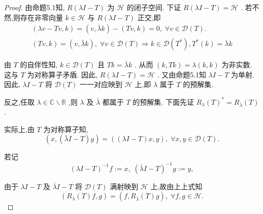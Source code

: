 \documentclass[lang=cn,newtx,10pt,scheme=chinese,thmcnt=chapter]{elegantbook}
\begin{document}
\begin{proof}
    由命题5.1知, \(R\left( {{\lambda I} - T}\right)\) 为 \(\mathcal{H}\) 的闭子空间. 下证 \(R\left( {{\lambda I} - T}\right)  = \mathcal{H}\) . 若不然,则存在非零向量 \(k \in  \mathcal{H}\) 与 \(R\left( {{\lambda I} - T}\right)\) 正交,即
\begin{equation*}
\begin{aligned}
    \left( {{\lambda v} - {Tv},k}\right)  = \left( {v,\bar{\lambda }k}\right)  - \left( {{Tv},k}\right)  = 0,\;\forall v \in  \mathcal{D}(T) .\\
\left( {{Tv},k}\right)  =     \left( {v,\bar{\lambda }k}\right)  ,\;\forall v \in  \mathcal{D}(T) \Rightarrow k\in\mathcal{D}(T^*),T^*(k)=\bar{\lambda}k
\end{aligned}
\end{equation*}

由 \(T\) 的自伴性知, \(k \in  \mathcal{D}(T)\) 且 \({Tk} = \bar{\lambda }k\) . 从而 \(\left( {k,{Tk}}\right)  = \lambda \left( {k,k}\right)\) 为非实数. 这与 \(T\) 为对称算子矛盾. 因此, \(R\left( {{\lambda I} - T}\right)  = \mathcal{H}\) . 又由命题5.1知 \({\lambda I} - T\) 为单射. 因此, \({\lambda I} - T\) 将 \(\mathcal{D}(T)\) 一一对应映到 \(\mathcal{H}\) 上,即 \(\lambda\) 属于 \(T\) 的预解集.

反之,任取 \(\lambda  \in  \mathbb{C} \smallsetminus  \mathbb{R}\) ,则 \(\lambda\) 及 \(\bar{\lambda }\) 都属于 \(T\) 的预解集. 下面先证 \({R}_{\lambda }{\left( T\right) }^{ * } = {R}_{\bar{\lambda }}\left( T\right)\) .

实际上,由 \(T\) 为对称算子知,
\begin{equation*}
\left( {x,\left( {\bar{\lambda }I - T}\right) y}\right)  = \left( {\left( {{\lambda I} - T}\right) x,y}\right) ,\;\forall x,y \in  \mathcal{D}(T) . \label{5.5}
\end{equation*}

若记
\begin{equation*}
{\left( \lambda I - T\right) }^{-1}f \mathrel{\text{ := }} x,\;{\left( \bar{\lambda }I - T\right) }^{-1}g \mathrel{\text{ := }} y, \label{5.6}
\end{equation*}

由于 \({\lambda I} - T\) 及 \(\bar{\lambda }I - T\) 将 \(\mathcal{D}(T)\) 满射映到 \(\mathcal{H}\) 上,故由上上式知
\begin{equation*}
\left( {{R}_{\lambda }\left( T\right) f,g}\right)  = \left( {f,{R}_{\bar{\lambda }}\left( T\right) g}\right) ,\;\forall f,g \in  \mathcal{H}. \label{5.7}
\end{equation*}


\end{proof}
\end{document}
